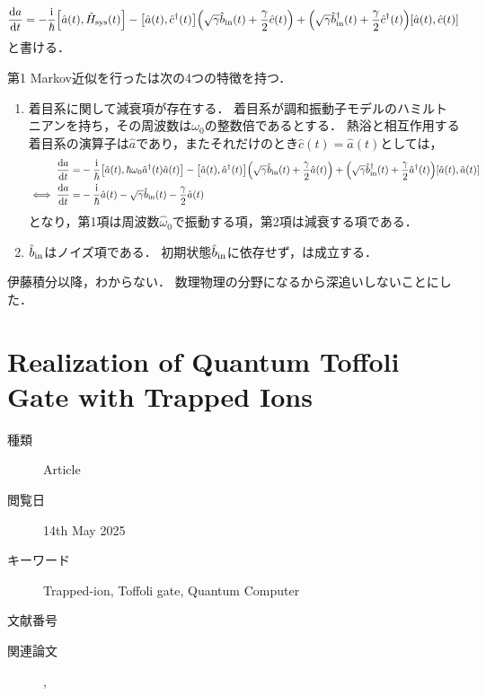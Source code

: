 \documentclass{report}
\begin{document}
      \begin{align}
        \dv{a}{t} = -\frac{\mathrm{i}}{\hbar}\qty[\hat{a}(t), \hat{H}_{\mathrm{sys}}(t)] - \qty[\hat{a}(t), \hat{c}^{\dag}(t)]\qty(\sqrt{\gamma}\hat{b}_{\mathrm{in}}(t) + \frac{\gamma}{2}\hat{c}(t)) + \qty(\sqrt{\gamma}\hat{b}^{\dag}_{\mathrm{in}}(t) + \frac{\gamma}{2}\hat{c}^{\dag}(t))\qty[\hat{a}(t), \hat{c}(t)] \label{PhysRevA.31.3761-a-markov-approximated}
      \end{align}
      と書ける．
      \par
      第1 Markov近似を行ったは次の4つの特徴を持つ．
      \begin{enumerate}
        \item 着目系に関して減衰項が存在する．
          着目系が調和振動子モデルのハミルトニアンを持ち，その周波数は$\omega_0$の整数倍であるとする．
          熱浴と相互作用する着目系の演算子は$\hat{a}$であり，またそれだけのとき$\hat{c}(t) = \hat{a}(t)$としては，
          \begin{align}
            \dv{a}{t} =& -\frac{\mathrm{i}}{\hbar}\qty[\hat{a}(t), \hbar\omega_0\hat{a}^{\dag}(t)\hat{a}(t)] - \qty[\hat{a}(t), \hat{a}^{\dag}(t)]\qty(\sqrt{\gamma}\hat{b}_{\mathrm{in}}(t) + \frac{\gamma}{2}\hat{a}(t)) + \qty(\sqrt{\gamma}\hat{b}^{\dag}_{\mathrm{in}}(t) + \frac{\gamma}{2}\hat{a}^{\dag}(t))\qty[\hat{a}(t), \hat{a}(t)] \\ 
            \iff \dv{a}{t} =& -\frac{\mathrm{i}}{\hbar}\hat{a}(t) - \sqrt{\gamma}\hat{b}_{\mathrm{in}}(t) - \frac{\gamma}{2}\hat{a}(t)
          \end{align}
          となり，第1項は周波数$\hat{\omega}_0$で振動する項，第2項は減衰する項である．
        \item $\hat{b}_{\mathrm{in}}$はノイズ項である．
          初期状態$\hat{b}_{\mathrm{in}}$に依存せず，は成立する．
      \end{enumerate}
      伊藤積分以降，わからない．
      数理物理の分野になるから深追いしないことにした．
  \chapter{Realization of Quantum Toffoli Gate with Trapped Ions}
    \begin{boxnote}
        \begin{description}
          \item[種類] Article
          \item[閲覧日] 14th May 2025
          \item[キーワード] Trapped-ion, Toffoli gate, Quantum Computer
          \item[文献番号] \cite{PhysRevA.106.042603}
          \item[関連論文] \cite{schmidt2003realize}, \cite{schmidt2003realization}
        \end{description}
      \end{boxnote}
\end{document}
